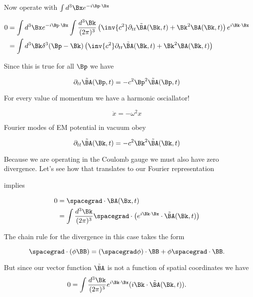Now operate with $\int d^3 \Bx e^{-i \Bp \cdot \Bx }$

\begin{align*}
0 &=
\int d^3 \Bx e^{-i \Bp \cdot \Bx }
\int 
\frac{d^3 \Bk}{(2\pi)^3} 
\left( 
\inv{c^2} \partial_{tt} \tilde{\BA}(\Bk, t) + \Bk^2 \BA(\Bk, t)
\right)
e^{i \Bk \cdot \Bx}  \\
&=
\int 
d^3 \Bk
\delta^3(\Bp -\Bk) 
\left( 
\inv{c^2} \partial_{tt} \tilde{\BA}(\Bk, t) + \Bk^2 \BA(\Bk, t)
\right)
\end{align*}

Since this is true for all $\Bp$ we have

\begin{equation}\label{eqn:relativisticElectrodynamicsL15:490}
\partial_{tt} \tilde{\BA}(\Bp, t) = -c^2 \Bp^2 \tilde{\BA}(\Bp, t) 
\end{equation}

For every value of momentum we have a harmonic osciallator!

\begin{equation}\label{eqn:relativisticElectrodynamicsL15:510}
\ddot{x} = -\omega^2 x
\end{equation}

Fourier modes of EM potential in vacuum obey

\begin{equation}\label{eqn:relativisticElectrodynamicsL15:530}
\partial_{tt} \tilde{\BA}(\Bk, t) = -c^2 \Bk^2 \tilde{\BA}(\Bk, t)
\end{equation}

Because we are operating in the Coulomb gauge we must also have zero divergence.  Let's see how that translates to our Fourier representation


implies

\begin{align*}
0 &= \spacegrad \cdot \BA(\Bx, t) \\
&= \int \frac{d^3 \Bk }{(2 \pi)^3} \spacegrad \cdot \left( e^{i \Bk \cdot \Bx} \cdot \tilde{\BA}(\Bk, t) \right)
\end{align*}

The chain rule for the divergence in this case takes the form

\begin{equation}\label{eqn:relativisticElectrodynamicsL15:840}
\spacegrad \cdot (\phi \BB) = (\spacegrad \phi) \cdot \BB + \phi \spacegrad \cdot \BB.
\end{equation}

But since our vector function $\tilde{\BA}$ is not a function of spatial coordinates we have
\begin{equation}\label{eqn:relativisticElectrodynamicsL15:570}
0 = \int \frac{d^3 \Bk }{(2 \pi)^3} e^{i \Bk \cdot \Bx} (i \Bk \cdot \tilde{\BA}(\Bk, t)).
\end{equation}


